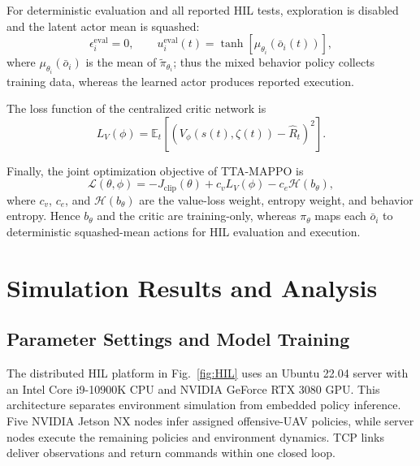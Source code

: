 \documentclass{cja}
\begin{document}
For deterministic evaluation and all reported HIL tests, exploration is disabled and the latent actor mean is squashed:
\begin{equation}
\epsilon_i^{\mathrm{eval}}=0,
\qquad
u_i^{\mathrm{eval}}(t)
=
\tanh
\left[
\mu_{\theta_i}
\left(
\bar o_i(t)
\right)
\right],
\end{equation}
where $\mu_{\theta_i}(\bar o_i)$ is the mean of $\widetilde\pi_{\theta_i}$; thus the mixed behavior policy collects training data, whereas the learned actor produces reported execution.

The loss function of the centralized critic network is
\begin{equation}
L_V(\phi)
=
\mathbb E_t
\left[
\left(
V_{\phi}(s(t),\zeta(t))
-
\hat R_t
\right)^2
\right].
\end{equation}

Finally, the joint optimization objective of TTA-MAPPO is
\begin{equation}
\mathcal L(\theta,\phi)
=
-J_{\mathrm{clip}}(\theta)
+
c_v L_V(\phi)
-
c_e\mathcal H(b_{\theta}),
\end{equation}
where $c_v$, $c_e$, and $\mathcal H(b_{\theta})$ are the value-loss weight, entropy weight, and behavior entropy. Hence $b_\theta$ and the critic are training-only, whereas $\pi_\theta$ maps each $\bar o_i$ to deterministic squashed-mean actions for HIL evaluation and execution.

\section{Simulation Results and Analysis}
\label{subsec:v71-case-study}

\subsection{Parameter Settings and Model Training}
\label{subsec:algo-net-setting}

The distributed HIL platform in Fig.~\ref{fig:HIL} uses an Ubuntu 22.04 server with an Intel Core i9-10900K CPU and NVIDIA GeForce RTX 3080 GPU. This architecture separates environment simulation from embedded policy inference. Five NVIDIA Jetson NX nodes infer assigned offensive-UAV policies, while server nodes execute the remaining policies and environment dynamics. TCP links deliver observations and return commands within one closed loop. 
\end{document}
